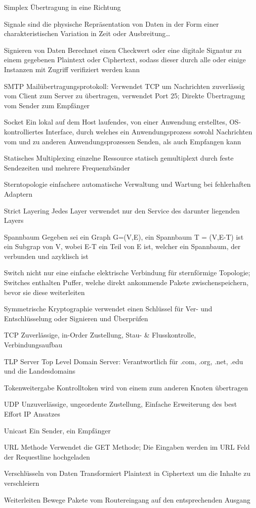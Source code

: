 \documentclass[10pt,landscape]{article}
\begin{document}
\begin{multicols}{3}
\begin{description*}
        \item[Simplex] Übertragung in eine Richtung
        \item[Signale] sind die physische Repräsentation von Daten in der Form einer charakteristischen Variation in Zeit oder Ausbreitung…
        \item[Signieren von Daten] Berechnet einen Checkwert oder eine digitale Signatur zu einem gegebenen Plaintext oder Ciphertext, sodass dieser durch alle oder einige Instanzen mit Zugriff verifiziert werden kann
        \item[SMTP] Mailübertragungsprotokoll: Verwendet TCP um Nachrichten zuverlässig vom Client zum Server zu übertragen, verwendet Port 25; Direkte Übertragung vom Sender zum Empfänger
        \item[Socket] Ein lokal auf dem Host laufendes, von einer Anwendung erstelltes, OS-kontrolliertes Interface, durch welches ein Anwendungsprozess sowohl Nachrichten vom und zu anderen Anwendungsprozessen Senden, als auch Empfangen kann
        \item[Statisches Multiplexing] einzelne Ressource statisch gemultiplext durch feste Sendezeiten und mehrere Frequenzbänder
        \item[Sterntopologie] einfachere automatische Verwaltung und Wartung bei fehlerhaften Adaptern
        \item[Strict Layering] Jedes Layer verwendet nur den Service des darunter liegenden Layers
        \item[Spannbaum] Gegeben sei ein Graph G=(V,E), ein Spannbaum T = (V,E-T) ist ein Subgrap von V, wobei E-T ein Teil von E ist, welcher ein Spannbaum, der verbunden und azyklisch ist
        \item[Switch] nicht nur eine einfache elektrische Verbindung für sternförmige Topologie; Switches enthalten Puffer, welche direkt ankommende Pakete zwischenspeichern, bevor sie diese weiterleiten
        \item[Symmetrische Kryptographie] verwendet einen Schlüssel für Ver- und Entschlüsselung oder Signieren und Überprüfen
        \item[TCP] Zuverlässige, in-Order Zustellung, Stau- \& Flusskontrolle, Verbindungsaufbau
        \item[TLP Server] Top Level Domain Server: Verantwortlich für .com, .org, .net, .edu und die Landesdomains
        \item[Tokenweitergabe] Kontrolltoken wird von einem zum anderen Knoten übertragen
        \item[UDP] Unzuverlässige, ungeordente Zustellung, Einfache Erweiterung des best Effort IP Ansatzes
        \item[Unicast] Ein Sender, ein Empfänger
        \item[URL Methode] Verwendet die GET Methode; Die Eingaben werden im URL Feld der Requestline hochgeladen
        \item[Verschlüsseln von Daten] Transformiert Plaintext in Ciphertext um die Inhalte zu verschleiern
        \item[Weiterleiten] Bewege Pakete vom Routereingang auf den entsprechenden Ausgang
    \end{description*}
    

\end{multicols}
\end{document}

